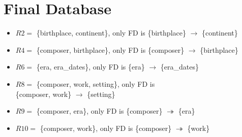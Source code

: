 \documentclass[11pt,letterpaper]{article}
\begin{document}
\section*{Final Database}
\begin{itemize}
    \item $R2 =$ \{birthplace, continent\}, only FD is \{birthplace\} $\to$ \{continent\}
    \item $R4 =$ \{composer, birthplace\}, only FD is \{composer\} $\to$ \{birthplace\}
    \item $R6 =$ \{era, era\_dates\}, only FD is \{era\} $\to$ \{era\_dates\}
    \item $R8 =$ \{composer, work, setting\}, only FD is \\\{composer, work\} $\to$ \{setting\}
    \item $R9 =$ \{composer, era\}, only FD is \{composer\} $\twoheadrightarrow$ \{era\}
    \item $R10 =$ \{composer, work\}, only FD is \{composer\} $\twoheadrightarrow$ \{work\}
\end{itemize}
\end{document}
